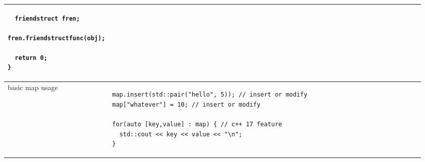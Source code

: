 \documentclass[main.tex,fontsize=8pt,paper=a4,paper=portrait,DIV=calc]{scrartcl}
\begin{document}
\begin{table}[ht!]
\begin{tabular}{|m{0.2\linewidth}|m{0.755\linewidth}|}
\begin{lstlisting}
  friendstruct fren;
  fren.friendstructfunc(obj);

  return 0;
}
\end{lstlisting} 
\\
\hline
basic map usage & 
\vspace{2mm}
\begin{lstlisting}
map.insert(std::pair("hello", 5)); // insert or modify
map["whatever"] = 10; // insert or modify

for(auto [key,value] : map) { // c++ 17 feature
  std::cout << key << value << "\n";
}
\end{lstlisting}
\\
\hline
\end{tabular}
\end{table}
\end{document}
